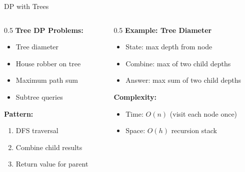 \documentclass[aspectratio=169,xcolor=dvipsnames]{beamer}
\begin{document}
\begin{frame}{DP with Trees}
  \begin{columns}
    \begin{column}{0.5\textwidth}
      \textbf{Tree DP Problems:}
      \begin{itemize}
        \item Tree diameter
        \item House robber on tree
        \item Maximum path sum
        \item Subtree queries
      \end{itemize}

      \vspace{0.3cm}
      \textbf{Pattern:}
      \begin{enumerate}
        \item DFS traversal
        \item Combine child results
        \item Return value for parent
      \end{enumerate}
    \end{column}

    \begin{column}{0.5\textwidth}
      \textbf{Example: Tree Diameter}
      \begin{itemize}
        \item State: max depth from node
        \item Combine: max of two child depths
        \item Answer: max sum of two child depths
      \end{itemize}

      \vspace{0.3cm}
      \textbf{Complexity:}
      \begin{itemize}
        \item Time: $O(n)$ (visit each node once)
        \item Space: $O(h)$ recursion stack
      \end{itemize}
    \end{column}
  \end{columns}
\end{frame}
\end{document}
